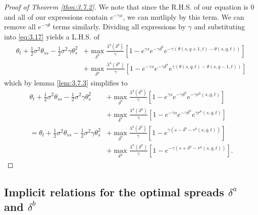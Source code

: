 \begin{proof}[Proof of Theorem \ref{thm:3.7.2}]
    We note that since the R.H.S. of our equation is 0 and all of our 
    expressions contain $e^{-\gamma x}$, we can mutliply by this term.
    We can remove all $e^{-\gamma \theta}$ terms similarly. Dividing 
    all expressions by $\gamma$ and substituting into \eqref{eq:3.17}
    yields a L.H.S. of
    \begin{align*}
        \theta_t+\frac{1}{2}\sigma^2\theta_{ss}-\frac{1}{2}\sigma^2\gamma\theta_s^2&+\max\limits_{\delta^b}\frac{\lambda^b(\delta^b)}{\gamma}[1-e^{\gamma s}e^{-\gamma \delta^b}e^{-\gamma(\theta(s,q+1,t)-\theta(s,q,t))}]\\
        &+\max\limits_{\delta^a}\frac{\lambda^a(\delta^a)}{\gamma}[1-e^{-\gamma s}e^{-\gamma\delta^a}e^{\gamma(\theta(s,q,t)-\theta(s,q-1,t))}]
    \end{align*}
    which by lemma \ref{lem:3.7.3} simplifies to
    \begin{align*}
        \theta_t+\frac{1}{2}\sigma^2\theta_{ss}-\frac{1}{2}\sigma^2\gamma\theta_s^2&+\max\limits_{\delta^b}\frac{\lambda^b(\delta^b)}{\gamma}[1-e^{\gamma s}e^{-\gamma \delta^b}e^{-\gamma r^b(s,q,t)}]\\
        &+\max\limits_{\delta^a}\frac{\lambda^a(\delta^a)}{\gamma}[1-e^{-\gamma s}e^{-\gamma\delta^a}e^{\gamma r^a(s,q,t)}]\\
        =\theta_t+\frac{1}{2}\sigma^2\theta_{ss}-\frac{1}{2}\sigma^2\gamma\theta_s^2&+\max\limits_{\delta^b}\frac{\lambda^b(\delta^b)}{\gamma}[1-e^{\gamma (s-\delta^b-r^b(s,q,t))}]\\
        &+\max\limits_{\delta^a}\frac{\lambda^a(\delta^a)}{\gamma}[1-e^{-\gamma (s+\delta^a-r^a(s,q,t))}].
    \end{align*}
\end{proof}

\subsection*{Implicit relations for the optimal spreads $\delta^a$ and $\delta^b$}

